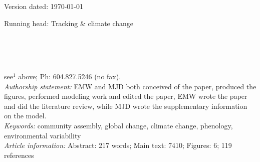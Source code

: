 \documentclass[11pt,letterpaper]{article}
\begin{document}
\begin{flushright}
Version dated: \today
\end{flushright}
\bigskip
\noindent Running head: Tracking \& climate change
\bigskip
\medskip
\begin{center}
\\
\bigskip
{}\\
\\
\medskip
\end{center}
 see$^{1}$ above; Ph: 604.827.5246 (no fax).\\

\noindent \emph{Authorship statement:} EMW and MJD both conceived of the paper, produced the figures, performed modeling work and edited the paper, EMW wrote the paper and did the literature review, while MJD wrote the supplementary information on the model.  \\
\noindent \emph{Keywords:} community assembly, global change, climate change, phenology, environmental variability\\
\noindent \emph{Article information:} Abstract: 217 words; Main text: 7410; Figures: 6; 119 references

\end{document}
